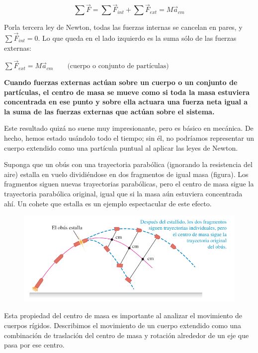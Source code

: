 \documentclass{article}
\newcommand{\bl}[1]{\textbf{#1}}
\newcommand{\definicion}[1]{%
    \vspace{0.5cm}
    \begin{definicionbox}
        #1
    \end{definicionbox}
    \vspace{0.5cm}
}
\begin{document}
    \[ \sum \vec{F} = \sum \vec{F}_{int} + \sum \vec{F}_{ext} = M \vec{a}_{cm} \]
    
    \par Porla tercera ley de Newton, todas las fuerzas internas se cancelan en pares, y $\sum \vec{F}_{int} = 0$. Lo que queda en el lado izquierdo es la suma sólo de las fuerzas externas:

    \definicion{
        \centering
        \( \sum \vec{F}_{ext} = M \vec{a}_{cm} \quad \quad \text{(cuerpo o conjunto de partículas)} \)
    }

    \definicion{
        \bl{
            Cuando fuerzas externas actúan sobre un cuerpo o un conjunto de partículas, el centro de masa se mueve como si toda la masa estuviera concentrada en ese punto y sobre ella actuara una fuerza neta igual a la suma de las fuerzas externas que actúan sobre el sistema.
        }
    }

    \par Este resultado quizá no suene muy impresionante, pero es básico en mecánica. De hecho, hemos estado usándolo todo el tiempo; sin él, no podríamos representar un cuerpo extendido como una partícula puntual al aplicar las leyes de Newton. 

    \pagebreak

    \par Suponga que un obús con una trayectoria parabólica (ignorando la resistencia del aire) estalla en vuelo dividiéndose en dos fragmentos de igual masa (ﬁgura). Los fragmentos siguen nuevas trayectorias parabólicas, pero el centro de masa sigue la trayectoria parabólica original, igual que si la masa aún estuviera concentrada ahí. Un cohete que estalla es un ejemplo espectacular de este efecto.

    \begin{figure}[H]
        \centering
        \includegraphics[scale=0.6]{img/7.5-1.png}
    \end{figure}

    \par Esta propiedad del centro de masa es importante al analizar el movimiento de cuerpos rígidos. Describimos el movimiento de un cuerpo extendido como una combinación de traslación del centro de masa y rotación alrededor de un eje que pasa por ese centro.
\end{document}
